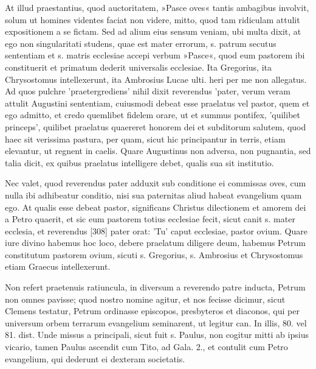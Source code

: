 At illud praestantius, quod auctoritatem, »Pasce oves« tantis ambagibus involvit, solum ut homines videntes faciat non videre, mitto, quod tam ridiculam attulit expositionem a se fictam. Sed ad alium eius sensum veniam, ubi multa dixit, at ego non singularitati studens, quae est mater errorum, s. patrum secutus sententiam et s. matris ecclesiae accepi verbum »Pasce«, quod eum pastorem ibi constituerit et primatum dederit universalis ecclesiae. Ita Gregorius, ita Chrysostomus intellexerunt, ita Ambrosius Lucae ulti. heri per me non allegatus. Ad quos pulchre 'praetergrediens' nihil dixit reverendus 'pater, verum veram attulit Augustini sententiam, cuiusmodi debeat esse praelatus vel pastor, quem et ego admitto, et credo quemlibet fidelem orare, ut et summus pontifex, 'quilibet princeps', quilibet praelatus quaereret honorem dei et subditorum salutem, quod haec sit verissima pastura, per quam, sicut hic principantur in terris, etiam elevantur, ut regnent in caelis. Quare Augustinus non adversa, non pugnantia, sed talia dicit, ex quibus praelatus intelligere debet, qualis sua sit institutio.

Nec valet, quod reverendus pater adduxit sub conditione ei commissas oves, cum nulla ibi adhibeatur conditio, nisi sua paternitas aliud habeat evangelium quam ego. At qualis esse debeat pastor, significans Christus dilectionem et amorem dei a Petro quaerit, et sic eum pastorem totius ecclesiae fecit, sicut canit s. mater ecclesia, et reverendus [308] pater orat: 'Tu' caput ecclesiae, pastor ovium. Quare iure divino habemus hoc loco, debere praelatum diligere deum, habemus Petrum constitutum pastorem ovium, sicuti s. Gregorius, s. Ambrosius et Chrysostomus etiam Graecus intellexerunt.

Non refert praetenuis ratiuncula, in diversum a reverendo patre inducta, Petrum non omnes pavisse; quod nostro nomine agitur, et nos fecisse dicimur, sicut Clemens testatur, Petrum ordinasse episcopos, presbyteros et diaconos, qui per universum orbem terrarum evangelium seminarent, ut legitur can. In illis, 80. vel 81. dist. Unde missus a principali, sicut fuit s. Paulus, non cogitur mitti ab ipsius vicario, tamen Paulus ascendit cum Tito, ad Gala. 2., et contulit cum Petro evangelium, qui dederunt ei dexteram societatis.

